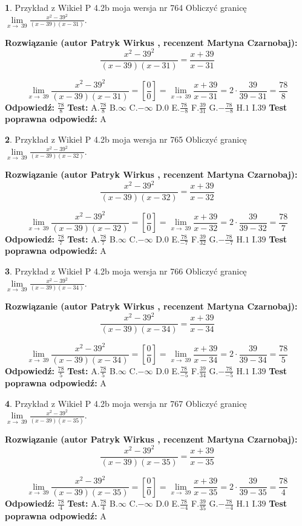 \documentclass[12pt, a4paper]{article}
\theoremstyle{definition} %
\newtheorem{zad}{}
\newcommand{\zadStart}[1]{\begin{zad}#1\newline}
\newcommand{\zadStop}{\end{zad}}
\newcommand{\rozwStart}[2]{\noindent \textbf{Rozwiązanie (autor #1 , recenzent #2): }\newline}
\newcommand{\rozwStop}{\newline}
\newcommand{\odpStart}{\noindent \textbf{Odpowiedź:}\newline}
\newcommand{\odpStop}{\newline}
\newcommand{\testStart}{\noindent \textbf{Test:}\newline}
\newcommand{\testStop}{\newline}
\newcommand{\kluczStart}{\noindent \textbf{Test poprawna odpowiedź:}\newline}
\newcommand{\kluczStop}{\newline}
\begin{document}
\zadStart{Przykład z Wikieł P 4.2b moja wersja nr 764}
Obliczyć granicę $\lim\limits_{x\to\ 39}\frac{x^{2}-39^{2}}{(x-39)(x-31)}$.
\zadStop
\rozwStart{Patryk Wirkus}{Martyna Czarnobaj}
$$\frac{x^{2}-39^{2}}{(x-39)(x-31)}=\frac{x+39}{x-31}$$

$$\lim\limits_{x\to\ 39}\frac{x^{2}-39^{2}}{(x-39)(x-31)}=[\frac{0}{0}]=\lim\limits_{x\to\ 39}\frac{x+39}{x-31}=2 \cdot \frac{39}{39-31} = \frac{78}{8}$$
\rozwStop
\odpStart
$\frac{78}{8}$
\odpStop
\testStart
A.$\frac{78}{8}$
B.$\infty$
C.$-\infty$
D.$0$
E.$\frac{78}{-8}$
F.$\frac{39}{31}$
G.$-\frac{78}{-8}$
H.$1$
I.$39$
\testStop
\kluczStart
A
\kluczStop



\zadStart{Przykład z Wikieł P 4.2b moja wersja nr 765}
Obliczyć granicę $\lim\limits_{x\to\ 39}\frac{x^{2}-39^{2}}{(x-39)(x-32)}$.
\zadStop
\rozwStart{Patryk Wirkus}{Martyna Czarnobaj}
$$\frac{x^{2}-39^{2}}{(x-39)(x-32)}=\frac{x+39}{x-32}$$

$$\lim\limits_{x\to\ 39}\frac{x^{2}-39^{2}}{(x-39)(x-32)}=[\frac{0}{0}]=\lim\limits_{x\to\ 39}\frac{x+39}{x-32}=2 \cdot \frac{39}{39-32} = \frac{78}{7}$$
\rozwStop
\odpStart
$\frac{78}{7}$
\odpStop
\testStart
A.$\frac{78}{7}$
B.$\infty$
C.$-\infty$
D.$0$
E.$\frac{78}{-7}$
F.$\frac{39}{32}$
G.$-\frac{78}{-7}$
H.$1$
I.$39$
\testStop
\kluczStart
A
\kluczStop



\zadStart{Przykład z Wikieł P 4.2b moja wersja nr 766}
Obliczyć granicę $\lim\limits_{x\to\ 39}\frac{x^{2}-39^{2}}{(x-39)(x-34)}$.
\zadStop
\rozwStart{Patryk Wirkus}{Martyna Czarnobaj}
$$\frac{x^{2}-39^{2}}{(x-39)(x-34)}=\frac{x+39}{x-34}$$

$$\lim\limits_{x\to\ 39}\frac{x^{2}-39^{2}}{(x-39)(x-34)}=[\frac{0}{0}]=\lim\limits_{x\to\ 39}\frac{x+39}{x-34}=2 \cdot \frac{39}{39-34} = \frac{78}{5}$$
\rozwStop
\odpStart
$\frac{78}{5}$
\odpStop
\testStart
A.$\frac{78}{5}$
B.$\infty$
C.$-\infty$
D.$0$
E.$\frac{78}{-5}$
F.$\frac{39}{34}$
G.$-\frac{78}{-5}$
H.$1$
I.$39$
\testStop
\kluczStart
A
\kluczStop



\zadStart{Przykład z Wikieł P 4.2b moja wersja nr 767}
Obliczyć granicę $\lim\limits_{x\to\ 39}\frac{x^{2}-39^{2}}{(x-39)(x-35)}$.
\zadStop
\rozwStart{Patryk Wirkus}{Martyna Czarnobaj}
$$\frac{x^{2}-39^{2}}{(x-39)(x-35)}=\frac{x+39}{x-35}$$

$$\lim\limits_{x\to\ 39}\frac{x^{2}-39^{2}}{(x-39)(x-35)}=[\frac{0}{0}]=\lim\limits_{x\to\ 39}\frac{x+39}{x-35}=2 \cdot \frac{39}{39-35} = \frac{78}{4}$$
\rozwStop
\odpStart
$\frac{78}{4}$
\odpStop
\testStart
A.$\frac{78}{4}$
B.$\infty$
C.$-\infty$
D.$0$
E.$\frac{78}{-4}$
F.$\frac{39}{35}$
G.$-\frac{78}{-4}$
H.$1$
I.$39$
\testStop
\kluczStart
A
\kluczStop
\end{document}
